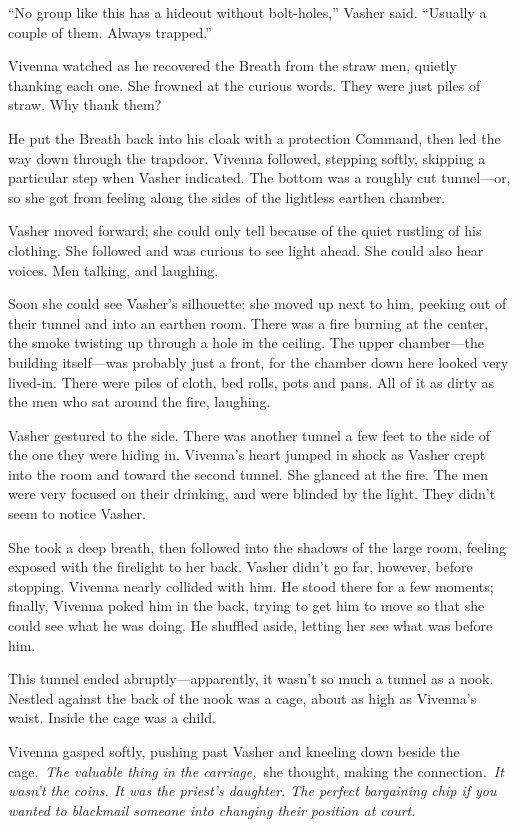 “No group like this has a hideout without bolt-holes,” Vasher said. “Usually a couple of them. Always trapped.”

Vivenna watched as he recovered the Breath from the straw men, quietly thanking each one. She frowned at the curious words. They were just piles of straw. Why thank them?

He put the Breath back into his cloak with a protection Command, then led the way down through the trapdoor. Vivenna followed, stepping softly, skipping a particular step when Vasher indicated. The bottom was a roughly cut tunnel—or, so she got from feeling along the sides of the lightless earthen chamber.

Vasher moved forward; she could only tell because of the quiet rustling of his clothing. She followed and was curious to see light ahead. She could also hear voices. Men talking, and laughing.

Soon she could see Vasher’s silhouette; she moved up next to him, peeking out of their tunnel and into an earthen room. There was a fire burning at the center, the smoke twisting up through a hole in the ceiling. The upper chamber—the building itself—was probably just a front, for the chamber down here looked very lived-in. There were piles of cloth, bed rolls, pots and pans. All of it as dirty as the men who sat around the fire, laughing.

Vasher gestured to the side. There was another tunnel a few feet to the side of the one they were hiding in. Vivenna’s heart jumped in shock as Vasher crept into the room and toward the second tunnel. She glanced at the fire. The men were very focused on their drinking, and were blinded by the light. They didn’t seem to notice Vasher.

She took a deep breath, then followed into the shadows of the large room, feeling exposed with the firelight to her back. Vasher didn’t go far, however, before stopping. Vivenna nearly collided with him. He stood there for a few moments; finally, Vivenna poked him in the back, trying to get him to move so that she could see what he was doing. He shuffled aside, letting her see what was before him.

This tunnel ended abruptly—apparently, it wasn’t so much a tunnel as a nook. Nestled against the back of the nook was a cage, about as high as Vivenna’s waist. Inside the cage was a child.

Vivenna gasped softly, pushing past Vasher and kneeling down beside the cage.~\textit{The valuable thing in the carriage,}~she thought, making the connection.~\textit{It wasn’t the coins. It was the priest’s daughter. The perfect bargaining chip if you wanted to blackmail someone into changing their position at court.}

